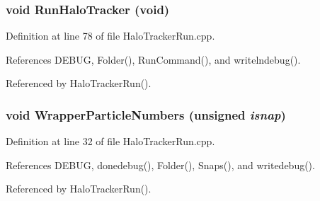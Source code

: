 \subsubsection[{RunHaloTracker}]{\setlength{\rightskip}{0pt plus 5cm}void RunHaloTracker (void)}\label{HaloTrackerRun_8cpp_aa0ead2fefc5a3e2e7ad0a06648dd7a3e}


Definition at line 78 of file HaloTrackerRun.cpp.



References DEBUG, Folder(), RunCommand(), and writelndebug().



Referenced by HaloTrackerRun().

\subsubsection[{WrapperParticleNumbers}]{\setlength{\rightskip}{0pt plus 5cm}void WrapperParticleNumbers (unsigned {\em isnap})}\label{HaloTrackerRun_8cpp_a35514626dd97634821c7303fc640bc02}


Definition at line 32 of file HaloTrackerRun.cpp.



References DEBUG, donedebug(), Folder(), Snaps(), and writedebug().



Referenced by HaloTrackerRun().

